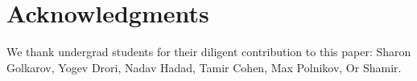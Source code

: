 \section{Acknowledgments}
We thank undergrad students for their diligent contribution to this paper: Sharon Golkarov, Yogev Drori, Nadav Hadad, Tamir Cohen, Max Polnikov, Or Shamir.